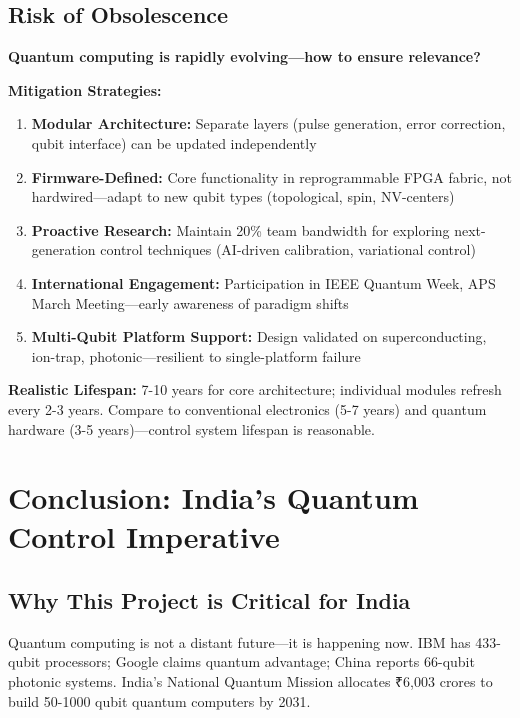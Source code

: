 \documentclass[12pt,a4paper]{article}
\begin{document}
\begin{enumerate}[leftmargin=*]
\subsection{Risk of Obsolescence}

\textbf{Quantum computing is rapidly evolving—how to ensure relevance?}

\textbf{Mitigation Strategies:}
\begin{enumerate}[leftmargin=*]
    \item \textbf{Modular Architecture:} Separate layers (pulse generation, error correction, qubit interface) can be updated independently
    \item \textbf{Firmware-Defined:} Core functionality in reprogrammable FPGA fabric, not hardwired—adapt to new qubit types (topological, spin, NV-centers)
    \item \textbf{Proactive Research:} Maintain 20\% team bandwidth for exploring next-generation control techniques (AI-driven calibration, variational control)
    \item \textbf{International Engagement:} Participation in IEEE Quantum Week, APS March Meeting—early awareness of paradigm shifts
    \item \textbf{Multi-Qubit Platform Support:} Design validated on superconducting, ion-trap, photonic—resilient to single-platform failure
\end{enumerate}

\textbf{Realistic Lifespan:} 7-10 years for core architecture; individual modules refresh every 2-3 years. Compare to conventional electronics (5-7 years) and quantum hardware (3-5 years)—control system lifespan is reasonable.

\newpage

\section{Conclusion: India's Quantum Control Imperative}

\subsection{Why This Project is Critical for India}

Quantum computing is not a distant future—it is happening now. IBM has 433-qubit processors; Google claims quantum advantage; China reports 66-qubit photonic systems. India's National Quantum Mission allocates ₹6,003 crores to build 50-1000 qubit quantum computers by 2031.


\end{enumerate}
\end{document}
